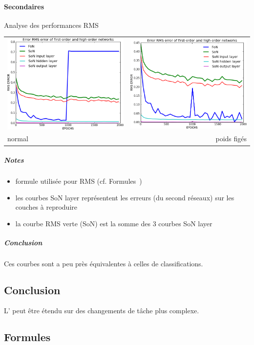     \paragraph{Secondaires}
       Analyse des performances RMS
      \begin{center}
	\begin{tabular}{lr}
	  \hspace*{-1cm}
	  \includegraphics[width=250px]{data/expB5/rms.png}
	  &
	  \includegraphics[width=250px]{data/expB5/rms_block.png} \\
	  normal
	  &
	  poids figés
	\end{tabular}
      \end{center} 
      \subparagraph{Notes}
	\begin{itemize}
	  \item formule utilisée pour RMS (cf. Formules~)
	  \item les courbes SoN layer représentent les erreurs (du second réseaux) sur les couches à reproduire 
	  \item la courbe RMS verte (SoN) est la somme des 3 courbes SoN layer
	\end{itemize}
      \subparagraph{Conclusion}
	Ces courbes sont a peu près équivalentes à celles de classifications.

  \subsection{Conclusion}
  L' peut être étendu sur des changements de tâche plus complexe.
  

  \newpage 
  \subsection{Formules}
    
    




